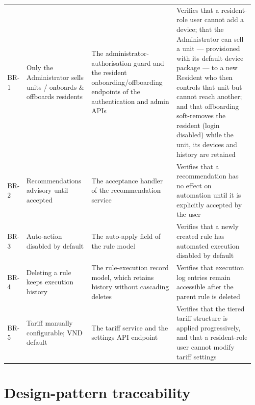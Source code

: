 \begin{longtable}{@{}L{1.7cm} L{4.3cm} L{4.4cm} L{3.4cm}@{}}
BR-1 & Only the Administrator sells units / onboards \& offboards residents & The administrator-authorisation guard and the resident onboarding/offboarding endpoints of the authentication and admin APIs & Verifies that a resident-role user cannot add a device; that the Administrator can sell a unit --- provisioned with its default device package --- to a new Resident who then controls that unit but cannot reach another; and that offboarding soft-removes the resident (login disabled) while the unit, its devices and history are retained \\
BR-2 & Recommendations advisory until accepted & The acceptance handler of the recommendation service & Verifies that a recommendation has no effect on automation until it is explicitly accepted by the user \\
BR-3 & Auto-action disabled by default & The auto-apply field of the rule model & Verifies that a newly created rule has automated execution disabled by default \\
BR-4 & Deleting a rule keeps execution history & The rule-execution record model, which retains history without cascading deletes & Verifies that execution log entries remain accessible after the parent rule is deleted \\
BR-5 & Tariff manually configurable; VND default & The tariff service and the settings API endpoint & Verifies that the tiered tariff structure is applied progressively, and that a resident-role user cannot modify tariff settings \\
\end{longtable}

\section{Design-pattern traceability}

